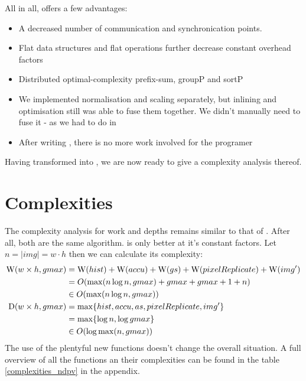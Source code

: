     All in all, \ndpv offers a few advantages:
    \begin{itemize}
      \item A decreased number of communication and synchronication points.
      \item Flat data structures and flat operations further decrease constant overhead factors 
      \item Distributed optimal-complexity prefix-sum, groupP and sortP
      \item We implemented normalisation and scaling separately, but inlining
              and optimisation still was able to fuse them together. We didn't
              manually need to fuse it - as we had to do in \man
      \item After writing \ndpn, there is no more work involved for the programer
    \end{itemize}
    Having transformed \ndpn into \ndpv, we are now ready to give a complexity analysis thereof.
    
  \section{Complexities}
    The complexity analysis for work and depths remains similar to that of \ndpn.
    After all, both are the same algorithm. \ndpv is only better at it's constant factors.
    Let $n = |img| = w\cdot h$ then we can calculate its complexity:
    \begin{equation}
    \begin{split}
    \textrm{W}(w \times h,gmax)
          & = \textrm{W}(hist) + \textrm{W}(accu) + \textrm{W}(gs) + \textrm{W}(pixelReplicate) + \textrm{W}(img') \\
          & = O( \max(n \log n, gmax) + gmax + gmax + 1 + n) \\
          & \in O(\max(n \log n, gmax)) \\
    \textrm{D}(w \times h,gmax)
        & = \max \{ hist, accu, as, pixelReplicate, img'\} \\
        & = \max \{\log n, \log gmax \} \\
        & \in O(\log \max(n,gmax)) \\
    \end{split}
    \end{equation}
    The use of the plentyful new functions doesn't change the overall situation.
    A full overview of all the functions an their complexities can be found in the table \ref{complexities_ndpv} in the appendix.
    
    
    
    
